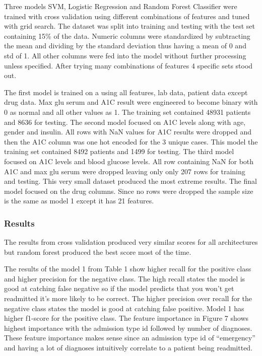 \documentclass[5p]{elsarticle} %
\begin{document}
Three models SVM, Logistic Regression and Random Forest Classifier were
trained with cross validation using different combinations of features
and tuned with grid search. The dataset was split into training and
testing with the test set containing 15\% of the data. Numeric columns
were standardized by subtracting the mean and dividing by the standard
deviation thus having a mean of 0 and std of 1. All other columns were
fed into the model without further processing unless specified. After
trying many combinations of features 4 specific sets stood out.

The first model is trained on a using all features, lab data, patient
data except drug data. Max glu serum and A1C result were engineered to
become binary with 0 as normal and all other values as 1. The training
set contained 48931 patients and 8636 for testing. The second model
focused on A1C levels along with age, gender and insulin. All rows with
NaN values for A1C results were dropped and then the A1C column was one
hot encoded for the 3 unique cases. This model the training set
contained 8492 patients and 1499 for testing. The third model focused on
A1C levels and blood glucose levels. All row containing NaN for both A1C
and max glu serum were dropped leaving only only 207 rows for training
and testing. This very small dataset produced the most extreme results.
The final model focused on the drug columns. Since no rows were dropped
the sample size is the same as model 1 except it has 21 features.

\hypertarget{results}{%
\subsubsection{Results}\label{results}}

The results from cross validation produced very similar scores for all
architectures but random forest produced the best score most of the
time.

The results of the model 1 from Table 1 show higher recall for the
positive class and higher precision for the negative class. The high
recall states the model is good at catching false negative so if the
model predicts that you won't get readmitted it's more likely to be
correct. The higher precision over recall for the negative class states
the model is good at catching false positive. Model 1 has higher
f1-score for the positive class. The feature importance in Figure 7
shows highest importance with the admission type id followed by number
of diagnoses. These feature importance makes sense since an admission
type id of ``emergency'' and having a lot of diagnoses intuitively
correlate to a patient being readmitted.
\end{document}
